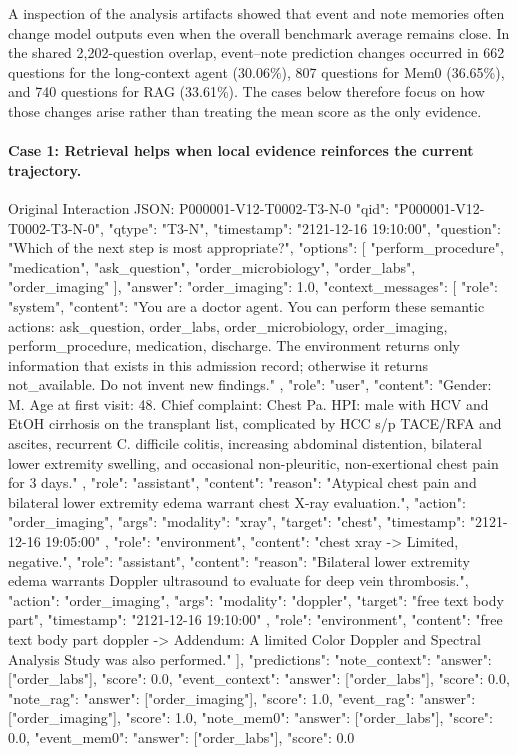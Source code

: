 A inspection of the analysis artifacts showed that event and note memories often change model outputs even when the overall benchmark average remains close. In the shared 2,202-question overlap, event--note prediction changes occurred in 662 questions for the long-context agent (30.06\%), 807 questions for Mem0 (36.65\%), and 740 questions for RAG (33.61\%). The cases below therefore focus on how those changes arise rather than treating the mean score as the only evidence.

\paragraph{Case 1: Retrieval helps when local evidence reinforces the current trajectory.}
\begin{promptblock}{Original Interaction JSON: P000001-V12-T0002-T3-N-0}
{
  "qid": "P000001-V12-T0002-T3-N-0",
  "qtype": "T3-N",
  "timestamp": "2121-12-16 19:10:00",
  "question": "Which of the next step is most appropriate?",
  "options": [
    "perform_procedure",
    "medication",
    "ask_question",
    "order_microbiology",
    "order_labs",
    "order_imaging"
  ],
  "answer": {"order_imaging": 1.0},
  "context_messages": [
    {
      "role": "system",
      "content": "You are a doctor agent. You can perform these semantic actions: ask_question, order_labs, order_microbiology, order_imaging, perform_procedure, medication, discharge. The environment returns only information that exists in this admission record; otherwise it returns not_available. Do not invent new findings."
    },
    {
      "role": "user",
      "content": "Gender: M. Age at first visit: 48. Chief complaint: Chest Pa. HPI: male with HCV and EtOH cirrhosis on the transplant list, complicated by HCC s/p TACE/RFA and ascites, recurrent C. difficile colitis, increasing abdominal distention, bilateral lower extremity swelling, and occasional non-pleuritic, non-exertional chest pain for 3 days."
    },
    {
      "role": "assistant",
      "content": {
        "reason": "Atypical chest pain and bilateral lower extremity edema warrant chest X-ray evaluation.",
        "action": "order_imaging",
        "args": {"modality": "xray", "target": "chest", "timestamp": "2121-12-16 19:05:00"}
      }
    },
    {"role": "environment", "content": "chest xray -> Limited, negative."},
    {
      "role": "assistant",
      "content": {
        "reason": "Bilateral lower extremity edema warrants Doppler ultrasound to evaluate for deep vein thrombosis.",
        "action": "order_imaging",
        "args": {"modality": "doppler", "target": "free text body part", "timestamp": "2121-12-16 19:10:00"}
      }
    },
    {"role": "environment", "content": "free text body part doppler -> Addendum: A limited Color Doppler and Spectral Analysis Study was also performed."}
  ],
  "predictions": {
    "note_context": {"answer": ["order_labs"], "score": 0.0},
    "event_context": {"answer": ["order_labs"], "score": 0.0},
    "note_rag": {"answer": ["order_imaging"], "score": 1.0},
    "event_rag": {"answer": ["order_imaging"], "score": 1.0},
    "note_mem0": {"answer": ["order_labs"], "score": 0.0},
    "event_mem0": {"answer": ["order_labs"], "score": 0.0}
  }
}
\end{promptblock}

